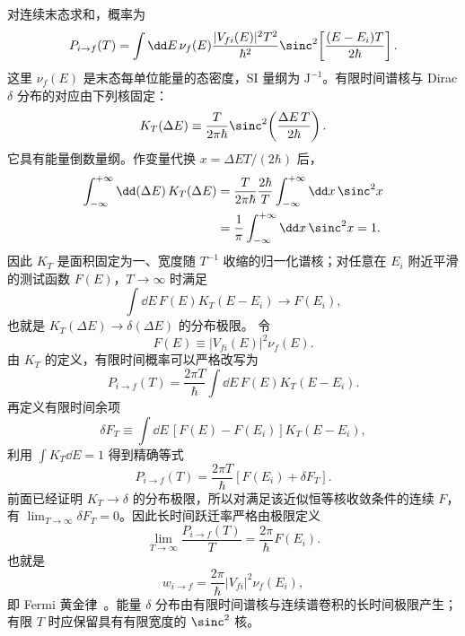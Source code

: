 \begin{derivation}[有限时间跃迁概率与黄金法则]
对连续末态求和，概率为
\begin{equation*}
 P_{i\to f}(T)
 =\int\dd E\,\nu_f(E)
 \frac{|V_{fi}(E)|^2T^2}{\hbar^2}
 \sinc^2\!\left[\frac{(E-E_i)T}{2\hbar}\right].
\end{equation*}
这里 $\nu_f(E)$ 是末态每单位能量的态密度，SI 量纲为 $\mathrm{J^{-1}}$。有限时间谱核与 Dirac $\delta$ 分布的对应由下列核固定：
\begin{equation*}
 K_T(\Delta E)
 \equiv
 \frac{T}{2\pi\hbar}
 \sinc^2\!\left(\frac{\Delta E\,T}{2\hbar}\right).
\end{equation*}
它具有能量倒数量纲。作变量代换 $x=\Delta E T/(2\hbar)$ 后，
\begin{align*}
 \int_{-\infty}^{+\infty}\dd(\Delta E)\,K_T(\Delta E)
 &=\frac{T}{2\pi\hbar}
 \frac{2\hbar}{T}
 \int_{-\infty}^{+\infty}\dd x\,\sinc^2x\\
 &=\frac1\pi\int_{-\infty}^{+\infty}\dd x\,\sinc^2x=1.
\end{align*}
因此 $K_T$ 是面积固定为一、宽度随 $T^{-1}$ 收缩的归一化谱核；对任意在 $E_i$ 附近平滑的测试函数 $F(E)$，$T\to\infty$ 时满足
\begin{equation*}
 \int\dd E\,F(E)K_T(E-E_i)\longrightarrow F(E_i),
\end{equation*}
也就是 $K_T(\Delta E)\to\delta(\Delta E)$ 的分布极限。
令
\begin{equation*}
F(E)\equiv |V_{fi}(E)|^2\nu_f(E).
\end{equation*}
由 $K_T$ 的定义，有限时间概率可以严格改写为
\begin{equation*}
P_{i\to f}(T)
=\frac{2\pi T}{\hbar}
\int\dd E\,F(E)K_T(E-E_i).
\end{equation*}
再定义有限时间余项
\begin{equation*}
\delta F_T
\equiv
\int\dd E\,[F(E)-F(E_i)]K_T(E-E_i),
\end{equation*}
利用 $\int K_T\dd E=1$ 得到精确等式
\begin{equation*}
P_{i\to f}(T)
=\frac{2\pi T}{\hbar}[F(E_i)+\delta F_T].
\end{equation*}
前面已经证明 $K_T\to\delta$ 的分布极限，所以对满足该近似恒等核收敛条件的连续 $F$，有 $\lim_{T\to\infty}\delta F_T=0$。因此长时间跃迁率严格由极限定义
\begin{equation*}
\lim_{T\to\infty}\frac{P_{i\to f}(T)}{T}
=\frac{2\pi}{\hbar}F(E_i).
\end{equation*}
也就是
\begin{equation*}
 w_{i\to f}=\frac{2\pi}{\hbar}|V_{fi}|^2\nu_f(E_i),
\end{equation*}
即 Fermi 黄金律~。能量 $\delta$ 分布由有限时间谱核与连续谱卷积的长时间极限产生；有限 $T$ 时应保留具有有限宽度的 $\sinc^2$ 核。
\end{derivation}


